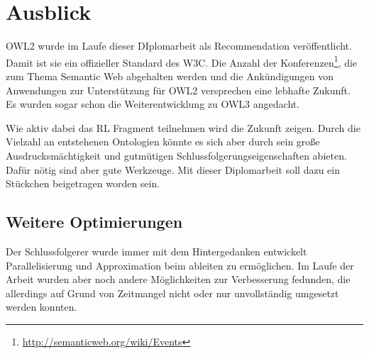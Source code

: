 \chapter{Ausblick}
\label{kapitel-ausblick}
OWL2 wurde im Laufe dieser DIplomarbeit als Recommendation veröffentlicht. Damit ist sie ein offizieller Standard des W3C. Die Anzahl der Konferenzen\footnote{\url{http://semanticweb.org/wiki/Events}}, die zum Thema Semantic Web abgehalten werden und die Ankündigungen von Anwendungen zur Unterstützung für OWL2 versprechen eine lebhafte Zukunft. Es wurden sogar schon die Weiterentwicklung zu OWL3 \cite{Hitzler2009} angedacht.

Wie aktiv dabei das RL Fragment teilnehmen wird die Zukunft zeigen. Durch die Vielzahl an entstehenen Ontologien könnte es sich aber durch sein große Ausdrucksmächtigkeit und gutmütigen Schlussfolgerungseigenschaften abieten. Dafür nötig sind aber gute Werkzeuge. Mit dieser Diplomarbeit soll dazu ein Stückchen beigetragen worden sein.

\section{Weitere Optimierungen}
\label{abschnitt-weitere-optimierungen}
Der Schlussfolgerer wurde immer mit dem  Hintergedanken entwickelt Parallelisierung und Approximation beim ableiten zu ermöglichen. Im Laufe der Arbeit wurden aber noch andere Möglichkeiten zur Verbesserung fedunden, die allerdings auf Grund von Zeitmangel nicht oder nur unvollständig umgesetzt werden konnten.

